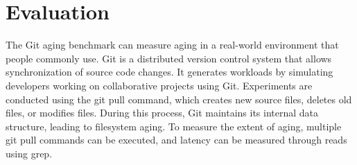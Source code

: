 \section{Evaluation}\label{s:eval}

The Git aging benchmark\cite{conway:login17,senescence:fast17} can measure aging in a real-world environment that people commonly use.
Git is a distributed version control system that allows synchronization of source code changes.
It generates workloads by simulating developers working on collaborative projects using Git.
Experiments are conducted using the git pull command, which creates new source files, deletes old files, or modifies files. During this process, Git maintains its internal data structure, leading to filesystem aging.
To measure the extent of aging, multiple git pull commands can be executed, and latency can be measured through reads using grep.

